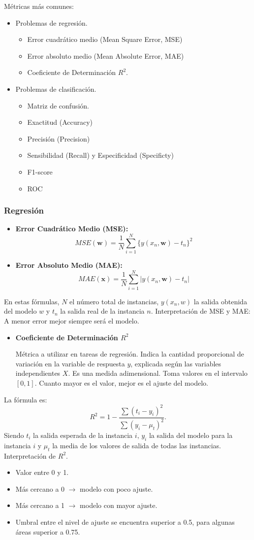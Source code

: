 Métricas más comunes:
\begin{itemize}
	\item Problemas de regresión.
	\begin{itemize}
		\item Error cuadrático medio (Mean Square Error, MSE)
		\item Error absoluto medio (Mean Absolute Error, MAE)
		\item Coeficiente de Determinación $R^2$.
	\end{itemize}
	\item Problemas de clasificación.
	\begin{itemize}
		\item Matriz de confusión.
		\item Exactitud (Accuracy)
		\item Precisión (Precision)
		\item Sensibilidad (Recall) y Especificidad (Specificty)
		\item F1-score
		\item ROC
	\end{itemize}
\end{itemize}
\subsubsection{Regresión}
\begin{itemize}
	\item \textbf{Error Cuadrático Medio (MSE):} \[ MSE(\mathbf{w})=\dfrac{1}{N}\sum_{i=1}^{N}\{y(x_n,\mathbf{w})-t_n\}^2 \]
	\item \textbf{Error Absoluto Medio (MAE):} \[ MAE(\mathbf{x})=\dfrac{1}{N}\sum_{i=1}^{N}|y(x_n,\mathbf{w})-t_n| \]
\end{itemize}
En estas fórmulas, $N$ el número total de instancias, $y(x_n,w)$ la salida obtenida del modelo $w$ y $t_n$ la salida real de la instancia $n$. Interpretación de MSE y MAE: A menor error mejor siempre será el modelo.
\begin{itemize}
	\item \textbf{Coeficiente de Determinación $R^2$}
	
	Métrica a utilizar en tareas de regresión. Indica la cantidad proporcional de variación en la variable de respuesta $y$, explicada según las variables independientes $X$. Es una medida adimensional. Toma valores en el intervalo $[0,1]$. Cuanto mayor es el valor, mejor es el ajuste del modelo.
\end{itemize}
La fórmula es: \[ R^2=1-\dfrac{\sum(t_i-y_i)^2}{\sum(y_i-\mu_t)^2}. \] Siendo $t_i$ la salida esperada de la instancia $i,\,y_i$ la salida del modelo para la instancia $i$ y $\mu_t$ la media de los valores de salida de todas las instancias. Interpretación de $R^2$.
\begin{itemize}
	\item Valor entre 0 y 1.
	\item Más cercano a 0 $\longrightarrow$ modelo con poco ajuste.
	\item Más cercano a 1 $\longrightarrow$ modelo con mayor ajuste.
	\item Umbral entre el nivel de ajuste se encuentra superior a 0.5, para algunas áreas superior a 0.75.
\end{itemize}

